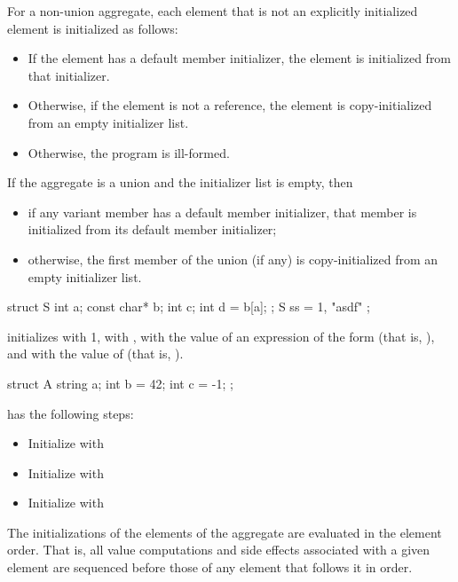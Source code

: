 \pnum
For a non-union aggregate,
each element that is not an explicitly initialized element
is initialized as follows:
\begin{itemize}
\item
If the element has a default member initializer,
the element is initialized from that initializer.
\item
Otherwise, if the element is not a reference, the element
is copy-initialized from an empty initializer list.
\item
Otherwise, the program is ill-formed.
\end{itemize}
If the aggregate is a union and the initializer list is empty, then
\begin{itemize}
\item
if any variant member has a default member initializer,
that member is initialized from its default member initializer;
\item
otherwise, the first member of the union (if any)
is copy-initialized from an empty initializer list.
\end{itemize}

\pnum
\begin{example}
\begin{codeblock}
struct S { int a; const char* b; int c; int d = b[a]; };
S ss = { 1, "asdf" };
\end{codeblock}
initializes
with 1,
with ,
with the value of an expression of the form
(that is, ), and  with the value of 
(that is, ).

\begin{codeblock}
struct A {
  string a;
  int b = 42;
  int c = -1;
};
\end{codeblock}

 has the following steps:
\begin{itemize}
\item Initialize  with \tcode{\{\}}
\item Initialize  with 
\item Initialize  with 
\end{itemize}
\end{example}

\pnum
The initializations of the elements of the aggregate
are evaluated in the element order.
That is,
all value computations and side effects associated with a given element
are sequenced before
those of any element that follows it in order.

